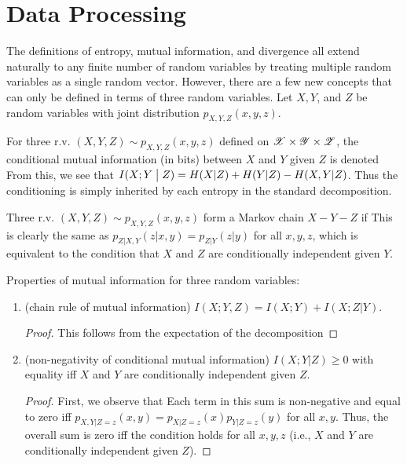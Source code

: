 \documentclass[letterpaper,10pt,english]{article}
\begin{document}
\section{Data Processing}
The definitions of entropy, mutual information, and divergence all extend naturally to any finite number of random variables by treating multiple random variables as a single random vector. However, there are a few new concepts that can only be defined in terms of three random variables. Let $X, Y$, and $Z$ be random variables with joint distribution $p_{X,Y,Z}(x,y,z)$. 
\begin{defn} 
For three r.v. $(X,Y,Z) \sim p_{X,Y,Z}(x,y,z)$ defined on $\mathscr{X} \times \mathscr{Y} \times \mathscr{Z}$, 
the conditional mutual information (in bits) between $X$ and $Y$ given $Z$ is denoted 
From this, we see that $I(X;Y\; \big\vert \; Z) = H(X | Z) + H(Y|Z) - H(X,Y |Z)$. 
Thus the conditioning is simply inherited by each entropy in the standard decomposition. 
\end{defn} 
\begin{defn} 
Three r.v. $(X, Y, Z) \sim p_{X,Y, Z} (x, y, z)$ form a Markov chain $X -Y - Z$ if 
This is clearly the same as $p_{Z|X,Y} (z|x, y) = p_{Z|Y} (z | y)$ for all $x, y, z$, 
which is equivalent to the condition that $X$ and $Z$ are conditionally independent given $Y$. 
\end{defn} 

\begin{lem}
Properties of mutual information for three random variables:
\begin{enumerate}
\item (chain rule of mutual information) $I(X;Y,Z)=I(X;Y)+I(X;Z|Y)$. 
\begin{proof}
This follows from the expectation of the decomposition
\end{proof} 
\item (non-negativity of conditional mutual information) $I (X ; Y |Z ) \ge 0$ with equality iff $X$ and $Y$ are conditionally independent given $Z$.
\begin{proof}
First, we observe that
Each term in this sum is non-negative and equal to zero iff $p_{X,Y|Z=z}(x,y) = p_{X|Z=z}(x)p_{Y|Z=z}(y)$ for all $x,y$. 
Thus, the overall sum is zero iff the condition holds for all $x, y, z$ (i.e., $X$ and $Y$ are conditionally independent given $Z$). 
\end{proof} 
\end{enumerate}
\end{lem} 
    
\end{document}
